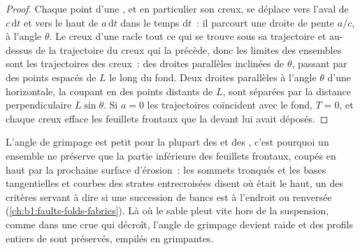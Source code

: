 \begin{proof}
Chaque point d'une , et en particulier son creux, se déplace vers l'aval de
$c\,\mathrm dt$ et vers le haut de $a\,\mathrm dt$ dans le temps $\mathrm dt$~: il parcourt
une droite de pente $a/c$, à l'angle $\theta$. Le creux d'une
 racle tout ce qui se trouve sous sa trajectoire et au-dessus de la trajectoire du
creux qui la précède, donc les limites des ensembles sont les trajectoires des creux~: des
droites parallèles inclinées de $\theta$, passant par des points espacés de $L$ le long du fond.
Deux droites parallèles à l'angle $\theta$ d'une horizontale, la coupant en
des points distants de $L$, sont séparées par la distance perpendiculaire
$L\sin\theta$. Si $a = 0$ les trajectoires coïncident avec le fond, $T = 0$, et chaque
creux efface les feuillets frontaux que la  devant lui avait déposés.
\end{proof}

L'angle de grimpage est petit pour la plupart des  et des , c'est pourquoi un ensemble
ne préserve que la partie inférieure des feuillets frontaux, coupés en haut par la prochaine
surface d'érosion~: les sommets tronqués et les bases tangentielles et courbes des
strates entrecroisées disent où était le haut, un des critères servant à dire si une
succession de bancs est à l'endroit ou renversée (\cref{ch:b1:faults-folds-fabrics}).
Là où le sable pleut vite hors de la suspension, comme dans une crue qui décroît, l'angle de
grimpage devient raide et des profils entiers de  sont préservés, empilés en 
grimpantes.

